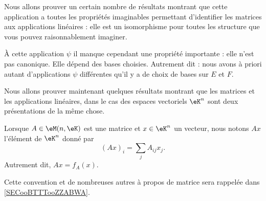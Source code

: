 \begin{normaltext}
    Nous allons prouver un certain nombre de résultats montrant que cette application a toutes les propriétés imaginables permettant d'identifier les matrices aux applications linéaires : elle est un isomorphisme pour toutes les structure que vous pouvez raisonnablement imaginer.

    À cette application \( \psi\) il manque cependant une propriété importante : elle n'est pas canonique. Elle dépend des bases choisies. Autrement dit : nous avons à priori autant d'applications \( \psi\) différentes qu'il y a de choix de bases sur \( E\) et \( F\). %

    Nous allons prouver maintenant quelques résultats montrant que les matrices et les applications linéaires, dans le cas des espaces vectoriels \( \eK^n\) sont deux présentations de la même chose.
\end{normaltext}

\begin{normaltext}
    Lorsque \( A\in \eM(n,\eK)\) est une matrice et \( x\in \eK^n\) un vecteur, nous notons \( Ax\) l'élément de \( \eK^n\) donné par
    \begin{equation}        \label{EQooQFVTooMFfzol}
        (Ax)_i=\sum_jA_{ij}x_j.
    \end{equation}
    Autrement dit, \( Ax=f_A(x)\).

    Cette convention et de nombreuses autres à propos de matrice sera rappelée dans \ref{SECooBTTTooZZABWA}.
\end{normaltext}

